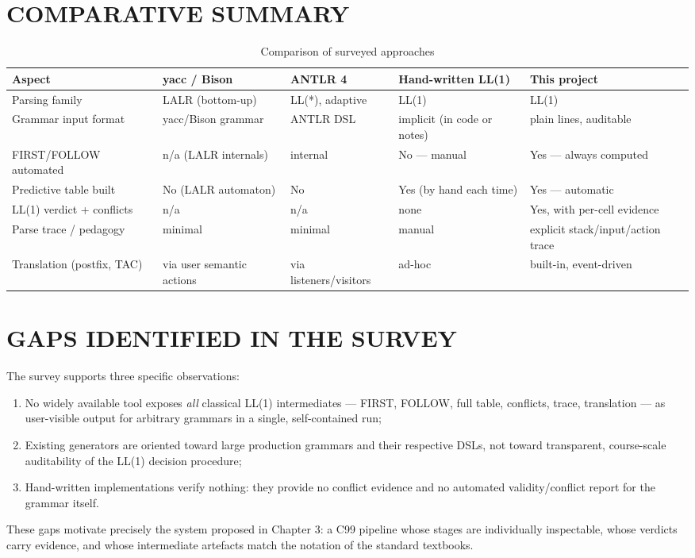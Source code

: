 \documentclass[12pt,a4paper,oneside,openany]{report}
\begin{document}
\section{COMPARATIVE SUMMARY}
\begin{table}[h]
  \caption{Comparison of surveyed approaches}
  \label{tab:comparison}
  \small
  \setlength{\tabcolsep}{4pt}
  \begin{tabularx}{\textwidth}{@{}p{2.5cm}>{\raggedright\arraybackslash}X>{\raggedright\arraybackslash}X>{\raggedright\arraybackslash}X>{\raggedright\arraybackslash}X@{}}
    \toprule
    \textbf{Aspect} & \textbf{yacc / Bison} & \textbf{ANTLR 4} &
    \textbf{Hand-written LL(1)} & \textbf{This project} \\
    \midrule
    Parsing family & LALR (bottom-up) & LL(*), adaptive &
    LL(1) & LL(1) \\
    Grammar input format & yacc/Bison grammar & ANTLR DSL
    & implicit (in code or notes) & plain lines, auditable \\
    FIRST/FOLLOW automated & n/a (LALR internals) & internal &
    No --- manual & Yes --- always computed \\
    Predictive table built & No (LALR automaton) & No &
    Yes (by hand each time) & Yes --- automatic \\
    LL(1) verdict + conflicts & n/a & n/a & none &
    Yes, with per-cell evidence \\
    Parse trace / pedagogy & minimal & minimal &
    manual & explicit stack/input/action trace \\
    Translation (postfix, TAC) & via user semantic actions &
    via listeners/visitors & ad-hoc & built-in, event-driven \\
    \bottomrule
  \end{tabularx}
\end{table}

\section{GAPS IDENTIFIED IN THE SURVEY}
The survey supports three specific observations:
\begin{enumerate}
  \item No widely available tool exposes \emph{all} classical LL(1)
        intermediates --- FIRST, FOLLOW, full table, conflicts, trace,
        translation --- as user-visible output for arbitrary grammars in a
        single, self-contained run;
  \item Existing generators are oriented toward large production grammars
        and their respective DSLs, not toward transparent, course-scale
        auditability of the LL(1) decision procedure;
  \item Hand-written implementations verify nothing: they provide no
        conflict evidence and no automated validity/conflict report for
        the grammar itself.
\end{enumerate}
These gaps motivate precisely the system proposed in Chapter 3: a C99
pipeline whose stages are individually inspectable, whose verdicts carry
evidence, and whose intermediate artefacts match the notation of the
standard textbooks.
\end{document}
